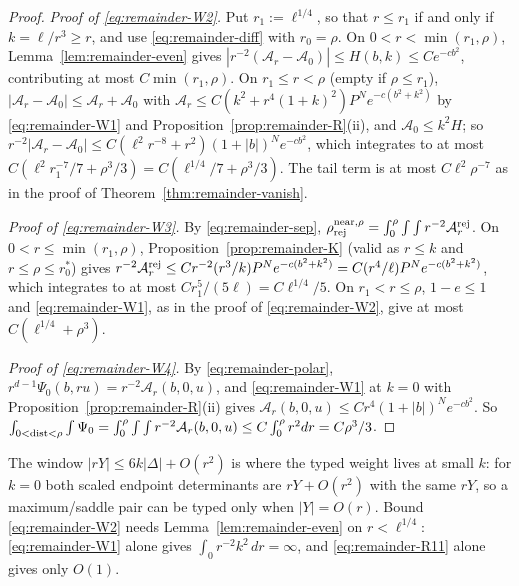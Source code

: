 \begin{proof}
\emph{Proof of \eqref{eq:remainder-W2}.} Put $r_1:=\ell^{1/4}$, so that $r\le r_1$ if and only if $k=\ell/r^3\ge r$, and use \eqref{eq:remainder-diff} with $r_0=\rho$. On $0<r<\min(r_1,\rho)$, Lemma~\ref{lem:remainder-even} gives $|r^{-2}(\mathcal A_r-\mathcal A_0)|\le H(b,k)\le Ce^{-cb^2}$, contributing at most $C\min(r_1,\rho)$. On $r_1\le r<\rho$ (empty if $\rho\le r_1$), $|\mathcal A_r-\mathcal A_0|\le\mathcal A_r+\mathcal A_0$ with $\mathcal A_r\le C(k^2+r^4(1+k)^2)P^Ne^{-c(b^2+k^2)}$ by \eqref{eq:remainder-W1} and Proposition~\ref{prop:remainder-R}(ii), and $\mathcal A_0\le k^2H$; so $r^{-2}|\mathcal A_r-\mathcal A_0|\le C(\ell^2r^{-8}+r^2)(1+|b|)^Ne^{-cb^2}$, which integrates to at most $C(\ell^2r_1^{-7}/7+\rho^3/3)=C(\ell^{1/4}/7+\rho^3/3)$. The tail term is at most $C\ell^2\rho^{-7}$ as in the proof of Theorem~\ref{thm:remainder-vanish}.

\emph{Proof of \eqref{eq:remainder-W3}.} By \eqref{eq:remainder-sep}, $\rho_{\mathrm{rej}}^{\mathrm{near},\rho}=\int_0^\rho\int\int r^{-2}\mathcal A^{\mathrm{rej}}_r$. On $0<r\le\min(r_1,\rho)$, Proposition~\ref{prop:remainder-K} (valid as $r\le k$ and $r\le\rho\le r_0^*$) gives $r^{-2}\mathcal A^{\mathrm{rej}}_r\le Cr^{-2}(r^3/k)P^Ne^{-c(b^2+k^2)}=C(r^4/\ell)P^Ne^{-c(b^2+k^2)}$, which integrates to at most $Cr_1^5/(5\ell)=C\ell^{1/4}/5$. On $r_1<r\le\rho$, $1-e\le1$ and \eqref{eq:remainder-W1}, as in the proof of \eqref{eq:remainder-W2}, give at most $C(\ell^{1/4}+\rho^3)$.

\emph{Proof of \eqref{eq:remainder-W4}.} By \eqref{eq:remainder-polar}, $r^{d-1}\Psi_0(b,ru)=r^{-2}\mathcal A_r(b,0,u)$, and \eqref{eq:remainder-W1} at $k=0$ with Proposition~\ref{prop:remainder-R}(ii) gives $\mathcal A_r(b,0,u)\le Cr^4(1+|b|)^Ne^{-cb^2}$. So $\int_{0<\operatorname{dist}<\rho}\int\Psi_0=\int_0^\rho\int\int r^{-2}\mathcal A_r(b,0,u)\le C\int_0^\rho r^2dr=C\rho^3/3$.
\end{proof}

The window $|rY|\le6k|\Delta|+O(r^2)$ is where the typed weight lives at small $k$: for $k=0$ both scaled endpoint determinants are $rY+O(r^2)$ with the same $rY$, so a maximum/saddle pair can be typed only when $|Y|=O(r)$. Bound \eqref{eq:remainder-W2} needs Lemma~\ref{lem:remainder-even} on $r<\ell^{1/4}$: \eqref{eq:remainder-W1} alone gives $\int_0r^{-2}k^2\,dr=\infty$, and \eqref{eq:remainder-R11} alone gives only $O(1)$.

